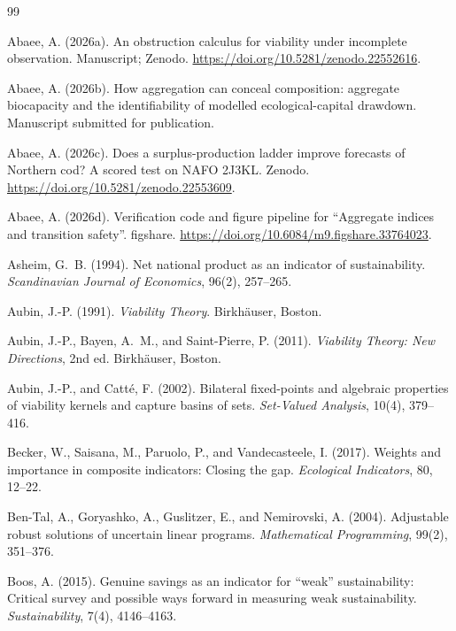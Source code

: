 \documentclass[preprint,11pt,authoryear]{elsarticle}
\theoremstyle{definition}
\theoremstyle{remark}
\begin{document}
\begin{thebibliography}{99}
\makeatletter\renewcommand{\@biblabel}[1]{}\makeatother

 Abaee, A. (2026a). An obstruction calculus for viability under incomplete observation. Manuscript; Zenodo. \url{https://doi.org/10.5281/zenodo.22552616}.

 Abaee, A. (2026b). How aggregation can conceal composition: aggregate biocapacity and the identifiability of modelled ecological-capital drawdown. Manuscript submitted for publication.

 Abaee, A. (2026c). Does a surplus-production ladder improve forecasts of Northern cod? A scored test on NAFO 2J3KL. Zenodo. \url{https://doi.org/10.5281/zenodo.22553609}.

 Abaee, A. (2026d). Verification code and figure pipeline for ``Aggregate indices and transition safety''. figshare. \url{https://doi.org/10.6084/m9.figshare.33764023}.

 Asheim, G.~B. (1994). Net national product as an indicator of sustainability. \emph{Scandinavian Journal of Economics}, 96(2), 257--265.

 Aubin, J.-P. (1991). \emph{Viability Theory}. Birkh\"auser, Boston.

 Aubin, J.-P., Bayen, A.~M., and Saint-Pierre, P. (2011). \emph{Viability Theory: New Directions}, 2nd ed. Birkh\"auser, Boston.

 Aubin, J.-P., and Catt\'e, F. (2002). Bilateral fixed-points and algebraic properties of viability kernels and capture basins of sets. \emph{Set-Valued Analysis}, 10(4), 379--416.

 Becker, W., Saisana, M., Paruolo, P., and Vandecasteele, I. (2017). Weights and importance in composite indicators: Closing the gap. \emph{Ecological Indicators}, 80, 12--22.

 Ben-Tal, A., Goryashko, A., Guslitzer, E., and Nemirovski, A. (2004). Adjustable robust solutions of uncertain linear programs. \emph{Mathematical Programming}, 99(2), 351--376.

 Boos, A. (2015). Genuine savings as an indicator for ``weak'' sustainability: Critical survey and possible ways forward in measuring weak sustainability. \emph{Sustainability}, 7(4), 4146--4163.


\end{thebibliography}
\end{document}
